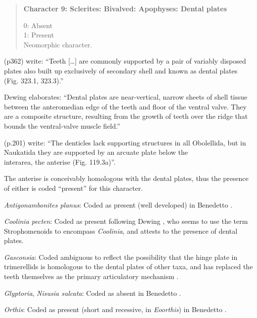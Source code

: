 \documentclass[openany]{book}
\theoremstyle{definition}
\theoremstyle{definition}
\theoremstyle{definition}
\theoremstyle{remark}
\begin{document}
\begin{quote}
\textbf{Character 9: Sclerites: Bivalved: Apophyses: Dental plates}

0: Absent\\
1: Present\\
Neomorphic character.
\end{quote}

\citet{Williams1997Introduction} (p362) write: ``Teeth {[}\ldots{}{]}
are commonly supported by a pair of variably disposed plates also built
up exclusively of secondary shell and known as dental plates (Fig.
323.1, 323.3).''

Dewing \citeyearpar{Dewing2001Hingemodifications} elaborates: ``Dental
plates are near-vertical, narrow sheets of shell tissue between the
anteromedian edge of the teeth and floor of the ventral valve. They are
a composite structure, resulting from the growth of teeth over the ridge
that bounds the ventral-valve muscle field.''

\citet{Williams2000LinguliformeaCraniiformea} (p.201) write: ``The
denticles lack supporting structures in all Obolellida, but in Naukatida
they are supported by an arcuate plate below the\\
interarea, the anterise (Fig. 119.3a)''.

The anterise is conceivably homologous with the dental plates, thus the
presence of either is coded ``present'' for this character.

\hypertarget{Antigonambonites_planus-coding-9}{}
\emph{Antigonambonites planus}: Coded as present (well developed) in
Benedetto \citeyearpar{Benedetto2009iChaniella}.

\hypertarget{Coolinia_pecten-coding-9}{}
\emph{Coolinia pecten}: Coded as present following Dewing
\citeyearpar{Dewing2001Hingemodifications}, who seems to use the term
Strophomenoids to encompass \emph{Coolinia}, and attests to the presence
of dental plates.

\hypertarget{Gasconsia-coding-9}{}
\emph{Gasconsia}: Coded ambiguous to reflect the possibility that the
hinge plate in trimerellids is homologous to the dental plates of other
taxa, and has replaced the teeth themselves as the primary articulatory
mechanism \citep[see][p.~184, for details of the
articulation]{Williams2000LinguliformeaCraniiformea}.

\hypertarget{Glyptoria-coding-9}{}
\emph{Glyptoria}, \emph{Nisusia sulcata}: Coded as absent in Benedetto
\citeyearpar{Benedetto2009iChaniella}.

\hypertarget{Orthis-coding-9}{}
\emph{Orthis}: Coded as present (short and recessive, in
\emph{Eoorthis}) in Benedetto \citeyearpar{Benedetto2009iChaniella}.
\end{document}
